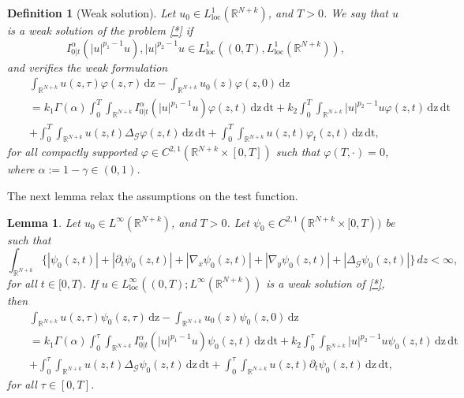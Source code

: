 \documentclass[reqno,11pt]{amsart}
\newtheorem{definition}{Definition}[section]
\newtheorem{lemma}[theorem]{Lemma}
\numberwithin{equation}{section}
\def\R{{\mathbb {R}}}
\def\R{\mathbb{R}}
\begin{document}
\begin{definition}[Weak solution]
	Let $u_0\in L_{\mathrm{loc}}^1(\R^{N+k})$, and $T>0$. We say that $u$ is a
	weak solution of the problem \eqref{*} if 
	$$I^\alpha_{0|t}(|u|^{p_1-1}u), |u|^{p_2-1}u \in L_{\mathrm{loc}}^1((0,T),L_{\mathrm{loc}}^1(\R^{N+k})) , $$
	and verifies the weak formulation
	\begin{eqnarray}\label{weaksolution}
		&&\int_{\R^{N+k}}u(z,\tau)\varphi(z,\tau)\,\mathrm{dz}-\int_{\R^{N+k}}u_0(z)\varphi(z,0)\,\mathrm{dz}\nonumber\\
		&&=k_1\Gamma(\alpha)\int_0^T\int_{\R^{N+k}}I^\alpha_{0|t}(|u|^{p_1-1}u)\varphi(z,t)\,\mathrm{dz}\,\mathrm{dt}+k_2\int_0^T\int_{\R^{N+k}}|u|^{p_2-1}u\varphi(z,t)\,\mathrm{dz}\,\mathrm{dt}\nonumber\\
		&&+\int_0^T\int_{\R^{N+k}}u(z,t)\Delta_{\mathcal{G}}\varphi(z,t)\,\mathrm{dz}\,\mathrm{dt}+\int_0^T\int_{\R^{N+k}}u(z,t)\varphi_t(z,t)\,\mathrm{dz}\,\mathrm{dt},
	\end{eqnarray}
	for all compactly supported $\varphi\in C^{2,1}(\R^{N+k}\times[0,T])$ such that $\varphi(T,\cdotp)=0$, where $\alpha:=1-\gamma\in(0,1)$.
\end{definition}

The next lemma relax the assumptions on the test function.



\begin{lemma}\label{lemma} 
	Let $u_0\in L^\infty(\R^{N+k})$, and $T>0$. Let $\psi_0\in C^{2,1}( \R^{N+k}\times[0,T))$ be such that
	\begin{equation}\label{49}
		\int_{ \R^{N+k}}\{|\psi_0(z,t)|+|\partial_t\psi_0(z,t)|+|\nabla_{x}\psi_0(z,t)|+|\nabla_{y}\psi_0(z,t)|+|\Delta_{\mathcal{G}}\psi_0(z,t)|\}\,dz<\infty,
	\end{equation}
	for all $t\in[0,T)$. If $ u\in  L_{\mathrm{loc}}^\infty((0,T);L^\infty(\R^{N+k}))$ is a weak solution of \eqref{*}, then 
	\begin{eqnarray*}
		&&\int_{\R^{N+k}}u(z,\tau) \psi_0(z,\tau)\,\mathrm{dz}-\int_{\R^{N+k}}u_0(z) \psi_0(z,0)\,\mathrm{dz}\nonumber\\
		&&=k_1\Gamma(\alpha)\int_0^\tau\int_{\R^{N+k}}I^\alpha_{0|t}(|u|^{p_1-1}u) \psi_0(z,t)\,\mathrm{dz}\,\mathrm{dt}+k_2\int_0^\tau\int_{\R^{N+k}}|u|^{p_2-1}u \psi_0(z,t)\,\mathrm{dz}\,\mathrm{dt}\nonumber\\
		&&+\int_0^\tau\int_{\R^{N+k}}u(z,t)\Delta_{\mathcal{G}} \psi_0(z,t)\,\mathrm{dz}\,\mathrm{dt}+\int_0^\tau\int_{\R^{N+k}}u(z,t) \partial_t\psi_0(z,t)\,\mathrm{dz}\,\mathrm{dt},
	\end{eqnarray*}
	for all $\tau\in[0,T]$.
\end{lemma}
\end{document}
